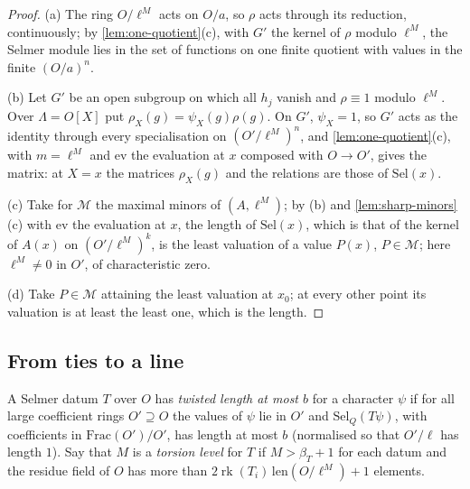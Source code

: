 \begin{proof}
(a) The ring $O/\ell^M$ acts on $O/a$, so $\rho$ acts through its reduction, continuously; by \cref{lem:one-quotient}(c), with $G'$ the kernel of $\rho$ modulo $\ell^M$, the Selmer module lies in the set of functions on one finite quotient with values in the finite $(O/a)^n$.

(b) Let $G'$ be an open subgroup on which all $h_j$ vanish and $\rho\equiv1$ modulo $\ell^M$. Over $\Lambda=O[X]$ put $\rho_X(g)=\psi_X(g)\rho(g)$. On $G'$, $\psi_X=1$, so $G'$ acts as the identity through every specialisation on $(O'/\ell^M)^n$, and \cref{lem:one-quotient}(c), with $m=\ell^M$ and $\mathrm{ev}$ the evaluation at $x$ composed with $O\to O'$, gives the matrix: at $X=x$ the matrices $\rho_X(g)$ and the relations are those of $\mathrm{Sel}(x)$.

(c) Take for $\mathcal M$ the maximal minors of $(A,\ell^M)$; by (b) and \cref{lem:sharp-minors}(c) with $\mathrm{ev}$ the evaluation at $x$, the length of $\mathrm{Sel}(x)$, which is that of the kernel of $A(x)$ on $(O'/\ell^M)^k$, is the least valuation of a value $P(x)$, $P\in\mathcal M$; here $\ell^M\ne0$ in $O'$, of characteristic zero.

(d) Take $P\in\mathcal M$ attaining the least valuation at $x_0$; at every other point its valuation is at least the least one, which is the length.
\end{proof}

\subsection{From ties to a line}\label{ss:line}
A Selmer datum $T$ over $O$ has \emph{twisted length at most $b$} for a character $\psi$ if for all large coefficient rings $O'\supseteq O$ the values of $\psi$ lie in $O'$ and $\mathrm{Sel}_Q(T\psi)$, with coefficients in $\mathrm{Frac}(O')/O'$, has length at
most $b$ (normalised so that $O'/\ell$ has length $1$). Say that $M$ is a \emph{torsion level} for $T$ if $M>\beta_T+1$ for each datum and the residue field of $O$ has more than $2\operatorname{rk}(T_i)\,\mathrm{len}(O/\ell^M)+1$ elements.

